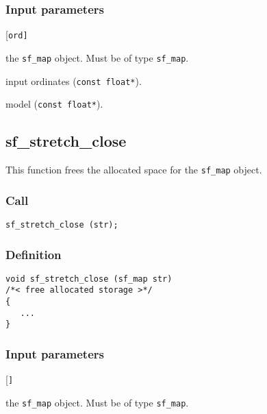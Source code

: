 \subsubsection*{Input parameters}
\begin{desclist}{\tt }{\quad}[\tt ord]
   \setlength\itemsep{0pt}
   \item[str] the \texttt{sf\_map} object. Must be of type \texttt{sf\_map}. 
   \item[ord] input ordinates (\texttt{const float*}).
   \item[mod] model (\texttt{const float*}).
\end{desclist}




\subsection{{sf\_stretch\_close}}
This function frees the allocated space for the \texttt{sf\_map} object.

\subsubsection*{Call}
\begin{verbatim}sf_stretch_close (str);\end{verbatim}

\subsubsection*{Definition}
\begin{verbatim}
void sf_stretch_close (sf_map str)
/*< free allocated storage >*/
{
   ...
}
\end{verbatim}

\subsubsection*{Input parameters}
\begin{desclist}{\tt }{\quad}[\tt ]
   \setlength\itemsep{0pt}
   \item[str] the \texttt{sf\_map} object. Must be of type \texttt{sf\_map}.
\end{desclist}





